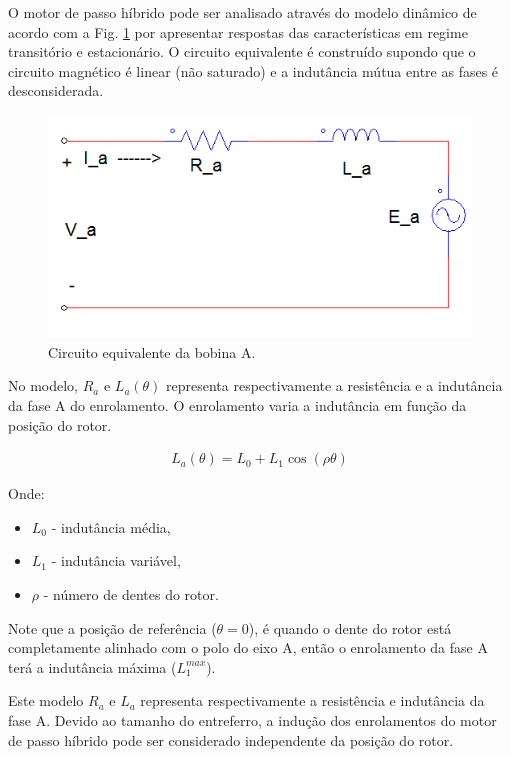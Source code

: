 O motor de passo híbrido pode ser analisado através do modelo dinâmico de acordo com a Fig. \ref{fig:fig1} por apresentar respostas das características em regime transitório e estacionário. O circuito equivalente é construído supondo que o circuito magnético é linear (não saturado) e a indutância mútua entre as fases é desconsiderada.

\begin{figure}[H]
	\centering
	\includegraphics[width = .8\columnwidth]{Images/graficofasea.PNG}
	\caption{ Circuito equivalente da bobina A.}
	\label{fig:fig1}
\end{figure}

No modelo, $R_a$ e $L_a(\theta)$ representa respectivamente a resistência e a indutância da fase A do enrolamento. O enrolamento varia a indutância em função da posição do rotor.

\begin{eqnarray}
	\label{eq:eq1a}
	L_a(\theta) = L_0 + L_1\cos(\rho \theta)
\end{eqnarray}

Onde:

\begin{itemize}
	 \item $L_0$ - indutância média,
	 \item $L_1$ - indutância variável,
	 \item $\rho$ - número de dentes do rotor.
\end{itemize}


Note que a posição de referência ($\theta = 0$), é quando o dente do rotor está completamente alinhado com o polo do eixo A, então o enrolamento da fase A terá a indutância máxima ($L_1^{max}$).

Este modelo $R_a$ e $L_a$ representa respectivamente a resistência e indutância da fase A. Devido ao tamanho do entreferro, a indução dos enrolamentos do motor de passo híbrido pode ser considerado independente da posição do rotor. 

